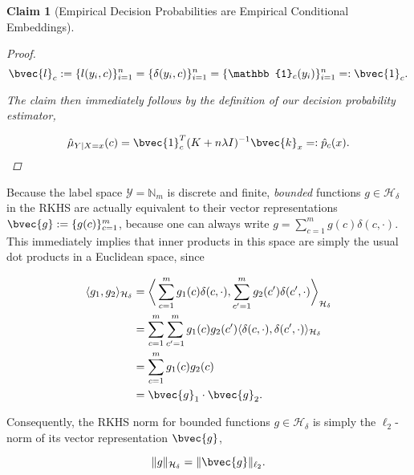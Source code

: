 \documentclass{article}
\newtheorem{claim}{Claim}[section]
\begin{document}
\begin{claim}[Empirical Decision Probabilities are Empirical Conditional Embeddings]
\begin{proof}
			\begin{equation}
				\bvec{l}_{c} := \{l(y_{i}, c)\}_{i = 1}^{n} = \{\delta(y_{i}, c)\}_{i = 1}^{n} = \{\mathbb{1}_{c}(y_{i})\}_{i = 1}^{n} =: \bvec{1}_{c}.
			\end{equation}
			
			The claim then immediately follows by the definition of our decision probability estimator,
			
			\begin{equation}
				\hat{\mu}_{Y | X = x}(c) = \bvec{1}_{c}^{T} (K + n \lambda I)^{-1} \bvec{k}_{x} =: \hat{p}_{c}(x).
			\end{equation}
		\end{proof}
		
	\end{claim}

	Because the label space $\mathcal{Y} = \mathbb{N}_{m}$ is discrete and finite, \textit{bounded} functions $g \in \mathcal{H}_{\delta}$ in the RKHS are actually equivalent to their vector representations $\bvec{g} := \{g(c)\}_{c = 1}^{m}$, because one can always write $g = \sum_{c = 1}^{m} g(c) \delta(c, \cdot)$. This immediately implies that inner products in this space are simply the usual dot products in a Euclidean space, since
	
	\begin{equation}
	\begin{aligned}
	\langle g_{1}, g_{2} \rangle_{\mathcal{H}_{\delta}} &= \bigg\langle \sum_{c = 1}^{m} g_{1}(c) \delta(c, \cdot), \sum_{c' = 1}^{m} g_{2}(c') \delta(c', \cdot)  \bigg\rangle_{\mathcal{H}_{\delta}} \\
	&= \sum_{c = 1}^{m} \sum_{c' = 1}^{m} g_{1}(c) g_{2}(c') \langle \delta(c, \cdot), \delta(c', \cdot) \rangle_{\mathcal{H}_{\delta}} \\
	&= \sum_{c = 1}^{m} g_{1}(c) g_{2}(c) \\
	&= \bvec{g}_{1} \cdot \bvec{g}_{2}.
	\end{aligned}
	\end{equation}
	
	Consequently, the RKHS norm for bounded functions $g \in \mathcal{H}_{\delta}$ is simply the $\ell_{2}$-norm of its vector representation $\bvec{g}$,
	
	\begin{equation}
	\lVert g \rVert_{\mathcal{H}_{\delta}} = \lVert \bvec{g} \rVert_{\ell_{2}}.
	\label{eq:rkhs_norm_is_l2_norm}
	\end{equation}
	
\end{document}
